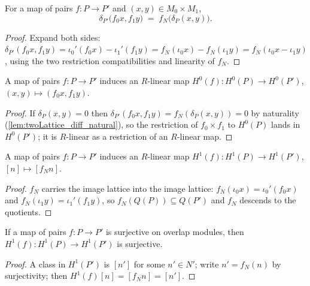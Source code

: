 \begin{lemma}
  \label{lem:twoLattice_diff_natural}
  \leanok
  For a map of pairs \(f : P \to P'\) and \((x, y) \in M_0 \times M_1\),
  \[
    \delta_{P'}\bigl(f_0 x, f_1 y\bigr) \;=\; f_N\bigl(\delta_P(x, y)\bigr) .
  \]
\end{lemma}
\begin{proof}
  \leanok
  Expand both sides:
  \(\delta_{P'}(f_0 x, f_1 y) = \iota_0'(f_0 x) - \iota_1'(f_1 y)
  = f_N(\iota_0 x) - f_N(\iota_1 y) = f_N(\iota_0 x - \iota_1 y)\), using the two
  restriction compatibilities and linearity of \(f_N\).
\end{proof}

\begin{definition}
  \label{def:twoLattice_h0Map}
  \leanok
  A map of pairs \(f : P \to P'\) induces an \(R\)-linear map
  \(H^0(f) : H^0(P) \to H^0(P')\), \((x, y) \mapsto (f_0 x, f_1 y)\).
\end{definition}
\begin{proof}
  \leanok
  If \(\delta_P(x,y) = 0\) then
  \(\delta_{P'}(f_0 x, f_1 y) = f_N(\delta_P(x,y)) = 0\) by naturality
  (\ref{lem:twoLattice_diff_natural}), so the restriction of \(f_0 \times f_1\) to
  \(H^0(P)\) lands in \(H^0(P')\); it is \(R\)-linear as a restriction of an \(R\)-linear
  map.
\end{proof}

\begin{definition}
  \label{def:twoLattice_h1Map}
  \leanok
  A map of pairs \(f : P \to P'\) induces an \(R\)-linear map
  \(H^1(f) : H^1(P) \to H^1(P')\), \([n] \mapsto [f_N n]\).
\end{definition}
\begin{proof}
  \leanok
  \(f_N\) carries the image lattice into the image lattice:
  \(f_N(\iota_0 x) = \iota_0'(f_0 x)\) and \(f_N(\iota_1 y) = \iota_1'(f_1 y)\), so
  \(f_N(Q(P)) \subseteq Q(P')\) and \(f_N\) descends to the quotients.
\end{proof}

\begin{lemma}
  \label{lem:twoLattice_h1Map_surjective}
  \leanok
  If a map of pairs \(f : P \to P'\) is surjective on overlap modules, then
  \(H^1(f) : H^1(P) \to H^1(P')\) is surjective.
\end{lemma}
\begin{proof}
  \leanok
  A class in \(H^1(P')\) is \([n']\) for some \(n' \in N'\); write \(n' = f_N(n)\) by
  surjectivity; then \(H^1(f)[n] = [f_N n] = [n']\).
\end{proof}

